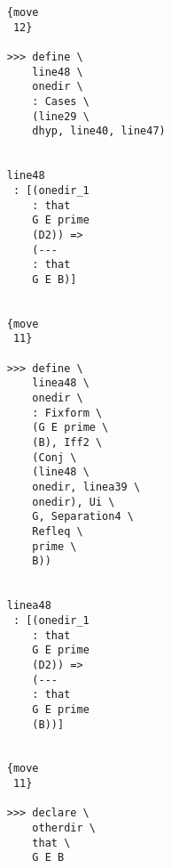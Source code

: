 \documentclass[12pt]{article}
\begin{document}
\begin{verbatim}
                                    {move 
                                     12}

                                    >>> define \
                                        line48 \
                                        onedir \
                                        : Cases \
                                        (line29 \
                                        dhyp, line40, line47)


                                    line48 
                                     : [(onedir_1 
                                        : that 
                                        G E prime 
                                        (D2)) => 
                                        (--- 
                                        : that 
                                        G E B)]


                                    {move 
                                     11}

                                    >>> define \
                                        linea48 \
                                        onedir \
                                        : Fixform \
                                        (G E prime \
                                        (B), Iff2 \
                                        (Conj \
                                        (line48 \
                                        onedir, linea39 \
                                        onedir), Ui \
                                        G, Separation4 \
                                        Refleq \
                                        prime \
                                        B))


                                    linea48 
                                     : [(onedir_1 
                                        : that 
                                        G E prime 
                                        (D2)) => 
                                        (--- 
                                        : that 
                                        G E prime 
                                        (B))]


                                    {move 
                                     11}

                                    >>> declare \
                                        otherdir \
                                        that \
                                        G E B



\end{verbatim}
\end{document}
